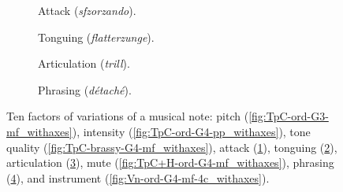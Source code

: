 \begin{figure}
        \vspace{3mm}

        \begin{subfigure}{0.25\textwidth}
                \centering
                \caption{Attack (\emph{sfzorzando}).}
                \label{fig:TpC-sfz-G4-fp_withaxes}
        \end{subfigure}%
        \begin{subfigure}{0.25\textwidth}
                \centering
                \caption{Tonguing (\emph{flatterzunge}).}
                \label{fig:TpC-flatt-G4-mf_withaxes}
        \end{subfigure}

        \vspace{3mm}

        \begin{subfigure}{0.25\textwidth}
                \centering
                \caption{Articulation (\emph{trill}).}
                \label{fig:TpC-trill-maj2-G4-mf_withaxes}
        \end{subfigure}%
        \begin{subfigure}{0.25\textwidth}
                \centering
                \caption{Phrasing (\emph{d\'{e}tach\'{e}}).}
                \label{fig:TpC+voc-harms-G4-mf_withaxes}
        \end{subfigure}%
        \caption{Ten factors of variations of a musical note: pitch (\ref{fig:TpC-ord-G3-mf_withaxes}), intensity (\ref{fig:TpC-ord-G4-pp_withaxes}), tone quality (\ref{fig:TpC-brassy-G4-mf_withaxes}), attack (\ref{fig:TpC-sfz-G4-fp_withaxes}), tonguing (\ref{fig:TpC-flatt-G4-mf_withaxes}), articulation (\ref{fig:TpC-trill-maj2-G4-mf_withaxes}), mute (\ref{fig:TpC+H-ord-G4-mf_withaxes}), phrasing (\ref{fig:TpC+voc-harms-G4-mf_withaxes}), and instrument (\ref{fig:Vn-ord-G4-mf-4c_withaxes}).}\label{fig:trumpet-variations}
\end{figure}

